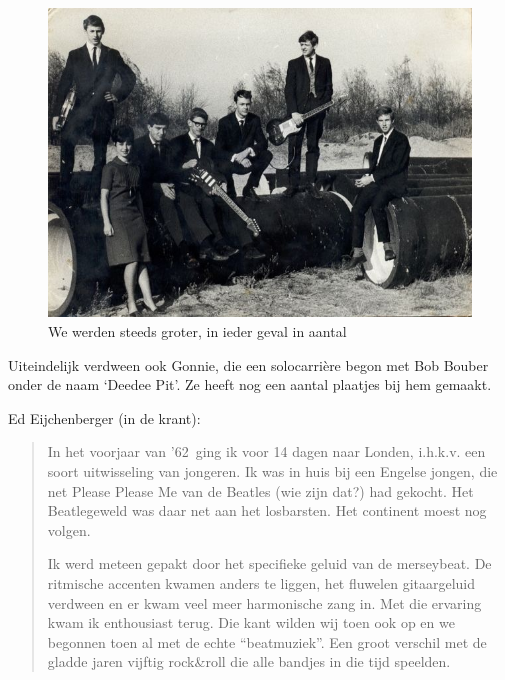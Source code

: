 \documentclass[12pt,twoside, openright]{memoir}
\begin{document}
\begin{figure}
\centering
\includegraphics[width=\textwidth]{img/ch26/1965}
\caption*{\footnotesize We werden steeds groter, in ieder geval in aantal}
\end{figure}

Uiteindelijk verdween ook Gonnie, die een solocarrière begon met Bob Bouber onder de naam `Deedee Pit'. Ze heeft nog een aantal plaatjes bij hem gemaakt.

Ed Eijchenberger (in de krant): 

\begin{quote}
In het voorjaar van '62 ging ik voor 14 dagen naar Londen, i.h.k.v. een soort uitwisseling van jongeren. Ik was in huis bij een Engelse jongen, die net Please Please Me van de Beatles (wie zijn dat?) had gekocht. Het Beatlegeweld was daar net aan het losbarsten. Het continent moest nog volgen. 

Ik werd meteen gepakt door het specifieke geluid van de merseybeat. De ritmische accenten kwamen anders te liggen, het fluwelen gitaargeluid verdween en er kwam veel meer harmonische zang in. Met die ervaring kwam ik enthousiast terug. Die kant wilden wij toen ook op en we begonnen toen al met de echte “beatmuziek”. Een groot verschil met de gladde jaren vijftig rock\&roll die alle bandjes in die tijd speelden.
\end{quote}
\end{document}
